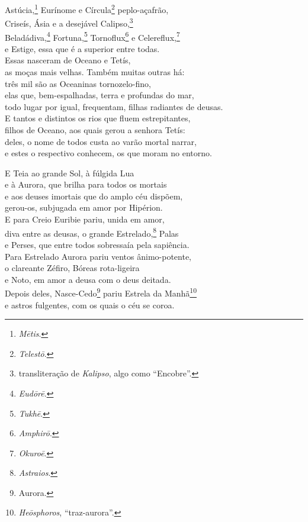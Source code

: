 Astúcia,\footnote{\emph{Mētis}.} Eurínome e Círcula\footnote{\emph{Telestō}.} peplo-açafrão,\\
Criseís, Ásia e a desejável Calipso,\footnote{transliteração de \emph{Kalipso}, algo como ``Encobre''.}\\
Beladádiva,\footnote{\emph{Eudōrē}.} Fortuna,\footnote{\emph{Tukhē}.} Tornoflux\footnote{\emph{Amphirō}.} e Celereflux,\footnote{\emph{Okuroē}.}\\
e Estige, essa que é a superior entre todas.\\
Essas nasceram de Oceano e Tetís,\\
as moças mais velhas. Também muitas outras há:\\
três mil são as Oceaninas tornozelo-fino,\\
elas que, bem-espalhadas, terra e profundas do mar, \\
todo lugar por igual, frequentam, filhas radiantes de deusas.\\
E tantos e distintos os rios que fluem estrepitantes,\\
filhos de Oceano, aos quais gerou a senhora Tetís:\\
deles, o nome de todos custa ao varão mortal narrar,\\
e estes o respectivo conhecem, os que moram no entorno. 

\quad{}E Teia ao grande Sol, à fúlgida Lua\\
e à Aurora, que brilha para todos os mortais\\
e aos deuses imortais que do amplo céu dispõem,\\
gerou-os, subjugada em amor por Hipérion.\\
E para Creio Euribie pariu, unida em amor, \\
diva entre as deusas, o grande Estrelado,\footnote{\emph{Astraios}.} Palas\\
e Perses, que entre todos sobressaía pela sapiência.\\
Para Estrelado Aurora pariu ventos ânimo-potente,\\
o clareante Zéfiro, Bóreas rota-ligeira\\
e Noto, em amor a deusa com o deus deitada. \\
Depois deles, Nasce-Cedo\footnote{Aurora.} pariu Estrela da Manhã\footnote{\emph{Heōsphoros}, ``traz-aurora''.}\\
e astros fulgentes, com os quais o céu se coroa.

